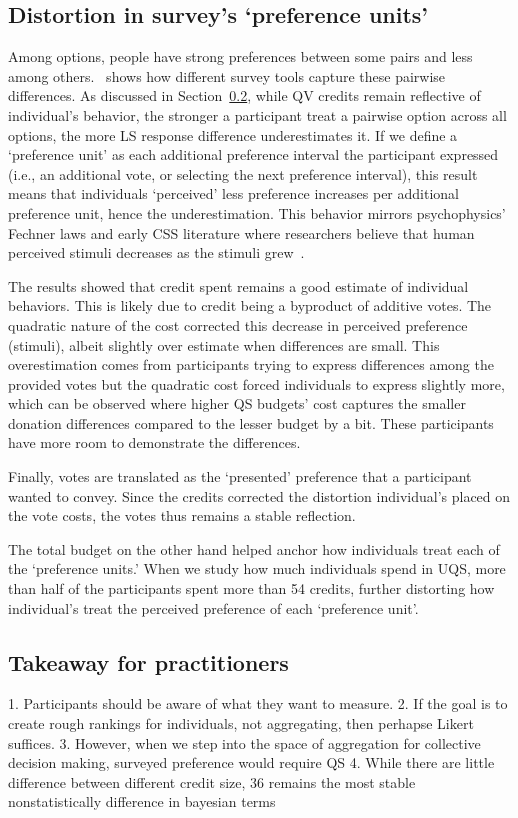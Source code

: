 \subsection{Distortion in survey's `preference units'}
Among options, people have strong preferences between some pairs and less among others.~ shows how different survey tools capture these pairwise differences. As discussed in Section~\ref{}, while QV credits remain reflective of individual's behavior, the stronger a participant treat a pairwise option across all options, the more LS response difference underestimates it. If we define a `preference unit' as each additional preference interval the participant expressed (i.e., an additional vote, or selecting the next preference interval), this result means that individuals `perceived' less preference increases per additional preference unit, hence the underestimation. This behavior mirrors psychophysics' Fechner laws and early CSS literature where researchers believe that human perceived stimuli decreases as the stimuli grew~\cite{}.

The results showed that credit spent remains a good estimate of individual behaviors. This is likely due to credit being a byproduct of additive votes. The quadratic nature of the cost corrected this decrease in perceived preference (stimuli), albeit slightly over estimate when differences are small. This overestimation comes from participants trying to express differences among the provided votes but the quadratic cost forced individuals to express slightly more, which can be observed where higher QS budgets' cost captures the smaller donation differences compared to the lesser budget by a bit. These participants have more room to demonstrate the differences.

Finally, votes are translated as the `presented' preference that a participant wanted to convey. Since the credits corrected the distortion individual's placed on the vote costs, the votes thus remains a stable reflection. 

The total budget on the other hand helped anchor how individuals treat each of the `preference units.' When we study how much individuals spend in UQS, more than half of the participants spent more than 54 credits, further distorting how individual's treat the perceived preference of each `preference unit'.

\subsection{Takeaway for practitioners}
1. Participants should be aware of what they want to measure.
2. If the goal is to create rough rankings for individuals, not aggregating, then perhapse Likert suffices.
3. However, when we step into the space of aggregation for collective decision making, surveyed preference would require QS
4. While there are little difference between different credit size, 36 remains the most stable nonstatistically difference in bayesian terms


